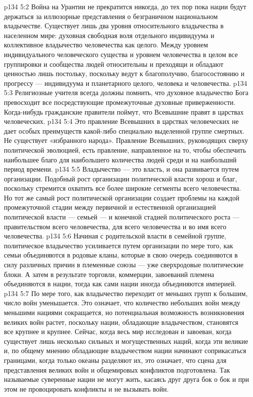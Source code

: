 \vs p134 5:2 \pc Война на Урантии не прекратится никогда, до тех пор пока нации будут держаться за иллюзорные представления о безграничном национальном владычестве. Существует лишь два уровня относительного владычества в населенном мире: духовная свободная воля отдельного индивидуума и коллективное владычество человечества как целого. Между уровнем индивидуального человеческого существа и уровнем человечества в целом все группировки и сообщества людей относительны и преходящи и обладают ценностью лишь постольку, поскольку ведут к благополучию, благосостоянию и прогрессу --- индивидуума и планетарного целого, человека и человечества.
\vs p134 5:3 Религиозные учителя всегда должны помнить, что духовное владычество Бога превосходит все посредствующие промежуточные духовные приверженности. Когда\hyp{}нибудь гражданские правители поймут, что Всевышние правят в царствах человеческих.
\vs p134 5:4 Это правление Всевышних в царствах человеческих не дает особых преимуществ какой\hyp{}либо специально выделенной группе смертных. Не существует «избранного народа». Правление Всевышних, руководящих сверху политической эволюцией, есть правление, направленное на то, чтобы обеспечить наибольшее благо для наибольшего количества людей среди  и на наибольший период времени.
\vs p134 5:5 Владычество --- это власть, и она развивается путем организации. Подобный рост организации политической власти хорош и благ, поскольку стремится охватить все более широкие сегменты всего человечества. Но тот же самый рост политической организации создает проблемы на каждой промежуточной стадии между первичной и естественной организацией политической власти --- семьей --- и конечной стадией политического роста --- правительством всего человечества, для всего человечества и во имя всего человечества.
\vs p134 5:6 Начиная с родительской власти в семейной группе, политическое владычество усиливается путем организации по мере того, как семьи объединяются в родовые кланы, которые в свою очередь соединяются в силу различных причин в племенные союзы --- уже сверхродовые политические блоки. А затем в результате торговли, коммерции, завоеваний племена объединяются в нации, тогда как сами нации иногда объединяются империей.
\vs p134 5:7 По мере того, как владычество переходит от меньших групп к большим, число войн уменьшается. Это означает, что количество небольших войн между меньшими нациями сокращается, но потенциальная возможность возникновения великих войн растет, поскольку нации, обладающие владычеством, становятся все крупнее и крупнее. Сейчас, когда весь мир исследован и завоеван, когда существует лишь несколько сильных и могущественных наций, когда эти великие и, по общему мнению обладающие владычеством нации начинают соприкасаться границами, когда только океаны разделяют их, это означает, что сцена для представления великих войн и общемировых конфликтов подготовлена. Так называемые суверенные нации не могут жить, касаясь друг друга бок о бок и при этом не провоцировать конфликты и не вызывать войн.
